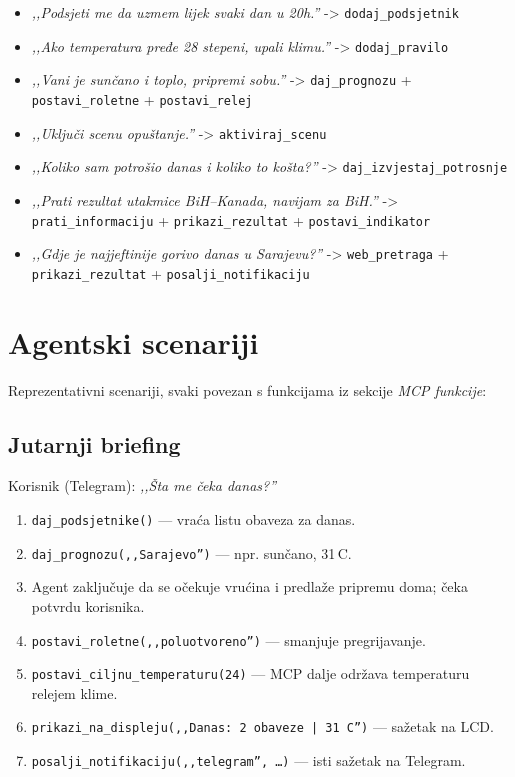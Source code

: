 \documentclass[11pt,a4paper]{article}
\begin{document}
\begin{itemize}[nosep]
      \item \emph{,,Podsjeti me da uzmem lijek svaki dan u 20h.''} -> \texttt{dodaj\_podsjetnik}
      \item \emph{,,Ako temperatura pređe 28 stepeni, upali klimu.''} -> \texttt{dodaj\_pravilo}
      \item \emph{,,Vani je sunčano i toplo, pripremi sobu.''} -> \texttt{daj\_prognozu} + \texttt{postavi\_roletne} + \texttt{postavi\_relej}
      \item \emph{,,Uključi scenu opuštanje.''} -> \texttt{aktiviraj\_scenu}
      \item \emph{,,Koliko sam potrošio danas i koliko to košta?''} -> \texttt{daj\_izvjestaj\_potrosnje}
      \item \emph{,,Prati rezultat utakmice BiH--Kanada, navijam za BiH.''} -> \texttt{prati\_informaciju} + \texttt{prikazi\_rezultat} + \texttt{postavi\_indikator}
      \item \emph{,,Gdje je najjeftinije gorivo danas u Sarajevu?''} -> \texttt{web\_pretraga} + \texttt{prikazi\_rezultat} + \texttt{posalji\_notifikaciju}
\end{itemize}

\section{Agentski scenariji}

Reprezentativni scenariji, svaki povezan s funkcijama iz sekcije \emph{MCP funkcije}:
\subsection{Jutarnji briefing}
Korisnik (Telegram): \emph{,,Šta me čeka danas?''}

\begin{enumerate}[nosep]
      \item \texttt{daj\_podsjetnike()} --- vraća listu obaveza za danas.
      \item \texttt{daj\_prognozu(,,Sarajevo'')} --- npr. sunčano, 31\,\textdegree C.
      \item Agent zaključuje da se očekuje vrućina i predlaže pripremu doma; čeka potvrdu
            korisnika.
      \item \texttt{postavi\_roletne(,,poluotvoreno'')} --- smanjuje pregrijavanje.
      \item \texttt{postavi\_ciljnu\_temperaturu(24)} --- MCP dalje održava temperaturu
            relejem klime.
      \item \texttt{prikazi\_na\_displeju(,,Danas: 2 obaveze | 31 C'')} --- sažetak na LCD.
      \item \texttt{posalji\_notifikaciju(,,telegram'', \dots)} --- isti sažetak na Telegram.
\end{enumerate}
\end{document}
